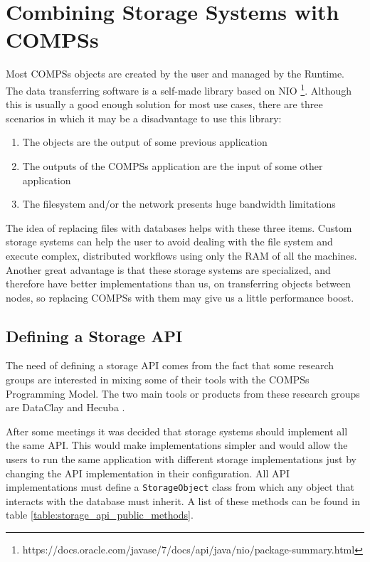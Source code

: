 \section{Combining Storage Systems with COMPSs}
\label{sec:storage}
Most COMPSs objects are created by the user and managed by the Runtime. The data transferring software is a self-made library based on NIO \footnote{https://docs.oracle.com/javase/7/docs/api/java/nio/package-summary.html}. Although this is usually a good enough solution for most use cases, there are three scenarios in which it may be a disadvantage to use this library:

\begin{enumerate}
\item The objects are the output of some previous application
\item The outputs of the COMPSs application are the input of some other application
\item The filesystem and/or the network presents huge bandwidth limitations
\end{enumerate}

The idea of replacing files with databases helps with these three items. Custom storage systems can help the user to avoid dealing with the file system and execute complex, distributed workflows using only the RAM of all the machines. Another great advantage is that these storage systems are specialized, and therefore have better implementations than us, on transferring objects between nodes, so replacing COMPSs with them may give us a little performance boost.

\subsection{Defining a Storage API}
\label{subsec:storage_api}
The need of defining a storage API comes from the fact that some research groups are interested in mixing some of their tools with the COMPSs Programming Model. The two main tools or products from these research groups are DataClay \cite{DataClay} and Hecuba \cite{alomar2015hecuba}.

After some meetings it was decided that storage systems should implement all the same API. This would make implementations simpler and would allow the users to run the same application with different storage implementations just by changing the API implementation in their configuration. All API implementations must define a \verb|StorageObject| class from which any object that interacts with the database must inherit. A list of these methods can be found in table \ref{table:storage_api_public_methods}.

